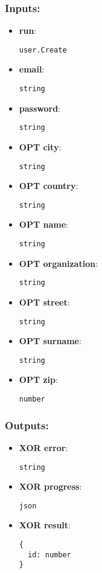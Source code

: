 \subsubsection*{Inputs:}
\begin{itemize}
    \item \textbf{run}: 
\begin{lstlisting}
user.Create
\end{lstlisting}
    \item \textbf{email}: 
\begin{lstlisting}
string
\end{lstlisting}
    \item \textbf{password}: 
\begin{lstlisting}
string
\end{lstlisting}
    \item \textbf{OPT city}: 
\begin{lstlisting}
string
\end{lstlisting}
    \item \textbf{OPT country}: 
\begin{lstlisting}
string
\end{lstlisting}
    \item \textbf{OPT name}: 
\begin{lstlisting}
string
\end{lstlisting}
    \item \textbf{OPT organization}: 
\begin{lstlisting}
string
\end{lstlisting}
    \item \textbf{OPT street}: 
\begin{lstlisting}
string
\end{lstlisting}
    \item \textbf{OPT surname}: 
\begin{lstlisting}
string
\end{lstlisting}
    \item \textbf{OPT zip}: 
\begin{lstlisting}
number
\end{lstlisting}
  \end{itemize}

\subsubsection*{Outputs:}
\begin{itemize}
    \item \textbf{XOR error}: 
\begin{lstlisting}
string
\end{lstlisting}
    \item \textbf{XOR progress}: 
\begin{lstlisting}
json
\end{lstlisting}
    \item \textbf{XOR result}: 
\begin{lstlisting}
{
  id: number
}
\end{lstlisting}
  \end{itemize}


